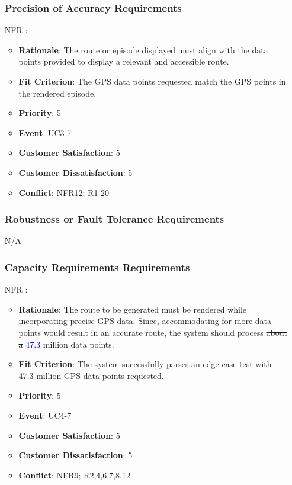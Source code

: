 \documentclass[12pt, titlepage]{article}
\newcounter{reqnum} %
\newcounter{freqnum} %
\begin{document}
\begin{itemize}
\subsubsection{Precision of Accuracy Requirements}
\item[NFR\refstepcounter{freqnum}\thefreqnum
\label{NFR}:] 
\begin{itemize}
    \item \textbf{Rationale}: The route or episode displayed must align with the data points provided to display a relevant and accessible route.
    \item \textbf{Fit Criterion}: The GPS data points requested match the GPS points in the rendered episode.
    \item \textbf{Priority}: 5
    \item \textbf{Event}: UC3-7%
    \item \textbf{Customer Satisfaction}: 5
    \item \textbf{Customer Dissatisfaction}: 5
    \item \textbf{Conflict}: NFR12; R1-20
\end{itemize}
\subsubsection{Robustness or Fault Tolerance Requirements}
N/A
\subsubsection{Capacity Requirements Requirements}
\item[NFR\refstepcounter{freqnum}\thefreqnum
\label{NFR}:] 
\begin{itemize}
    \item \textbf{Rationale}: The route to be generated must be rendered while incorporating precise GPS data. Since, accommodating for more data points would result in an accurate route, the system should process \sout{about a} \textcolor{blue}{47.3} million data points.
    \item \textbf{Fit Criterion}: The system successfully parses an edge case test with 47.3 million GPS data points requested.
    \item \textbf{Priority}: 5
    \item \textbf{Event}: UC4-7 %
    \item \textbf{Customer Satisfaction}: 5
    \item \textbf{Customer Dissatisfaction}: 5
    \item \textbf{Conflict}: NFR9; R2,4,6,7,8,12
\end{itemize}

\end{itemize}
\end{document}
